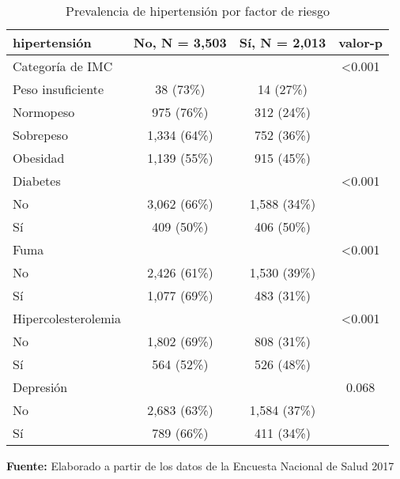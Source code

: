 \documentclass{aa}
\begin{document}
\begin{table}[]
\caption{\small Prevalencia de hipertensión por factor de riesgo}
    \centering
    \tiny

\captionsetup[table]{labelformat=empty,skip=1pt}
\begin{tabular}{lccc}
\toprule
\textbf{hipertensión} & \textbf{No}, N = 3,503 & \textbf{Sí}, N = 2,013 & valor-p \\ 
\midrule
Categoría de IMC &  &  & <0.001 \\ 
\-\hspace{5mm} \tiny Peso insuficiente & 38 (73\%) & 14 (27\%) &  \\ 
\-\hspace{5mm} \tiny Normopeso & 975 (76\%) & 312 (24\%) &  \\ 
\-\hspace{5mm} \tiny Sobrepeso & 1,334 (64\%) & 752 (36\%) &  \\ 
\-\hspace{5mm} \tiny Obesidad & 1,139 (55\%) & 915 (45\%) &  \\ 
Diabetes &  &  & <0.001 \\ 
\-\hspace{5mm} \tiny No & 3,062 (66\%) & 1,588 (34\%) &  \\ 
\-\hspace{5mm} \tiny Sí & 409 (50\%) & 406 (50\%) &  \\ 
Fuma &  &  & <0.001 \\ 
\-\hspace{5mm} \tiny No & 2,426 (61\%) & 1,530 (39\%) &  \\ 
\-\hspace{5mm} \tiny Sí & 1,077 (69\%) & 483 (31\%) &  \\ 
Hipercolesterolemia &  &  & <0.001 \\ 
\-\hspace{5mm} \tiny No & 1,802 (69\%) & 808 (31\%) &  \\ 
\-\hspace{5mm} \tiny Sí & 564 (52\%) & 526 (48\%) &  \\ 
Depresión &  &  & 0.068 \\ 
\-\hspace{5mm} \tiny No & 2,683 (63\%) & 1,584 (37\%) &  \\ 
\-\hspace{5mm} \tiny Sí & 789 (66\%) & 411 (34\%) &  \\ 
 \bottomrule
\end{tabular}

    {\raggedright \small \textbf{Fuente:} Elaborado a partir de los datos de la Encuesta Nacional de Salud 2017 \par}
\end{table}
\end{document}
